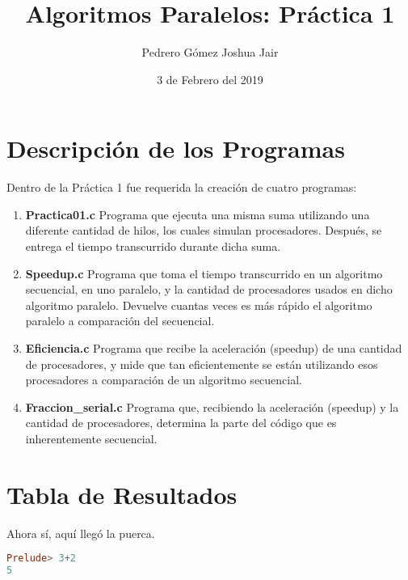 \documentclass{article}
\title{Algoritmos Paralelos: Práctica 1}
\author{Pedrero Gómez Joshua Jair}
\date{3 de Febrero del 2019}
\begin{document}
\maketitle

\section{Descripción de los Programas}

Dentro de la Práctica 1 fue requerida la creación de cuatro programas:
\begin{enumerate}
	\item \textbf{Practica01.c} \linebreak 
	Programa que ejecuta una misma suma utilizando una diferente cantidad de hilos, los cuales simulan procesadores. Después, se entrega el tiempo transcurrido durante dicha suma.
	\item \textbf{Speedup.c} \linebreak
	Programa que toma el tiempo transcurrido en un algoritmo secuencial,
	en uno paralelo, y la cantidad de procesadores usados en dicho algoritmo paralelo. Devuelve cuantas veces es más rápido el algoritmo paralelo a comparación del secuencial.
	\item \textbf{Eficiencia.c} \linebreak
	Programa que recibe la aceleración (speedup) de una cantidad de procesadores, y mide que tan eficientemente se están utilizando esos procesadores a comparación de un algoritmo secuencial.
	\item \textbf{Fraccion\_serial.c} \linebreak
	Programa que, recibiendo la aceleración (speedup) y la cantidad de procesadores, determina la parte del código que es inherentemente secuencial.
	
\end{enumerate}

\section{Tabla de Resultados}

Ahora sí, aquí llegó la puerca.

\begin{tabular}
	
\end{tabular}

\begin{lstlisting}[language=Haskell]
Prelude> 3+2
5
\end{lstlisting}
\end{document}
